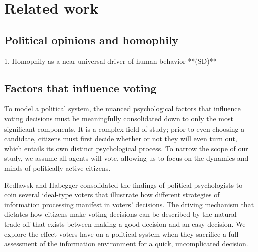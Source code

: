 \section{Related work}
\label{sec:related}



\subsection{Political opinions and homophily}
    1. Homophily as a near-universal driver of human behavior **(SD)**

\subsection{Factors that influence voting}
To model a political system, the nuanced psychological factors that influence voting decisions must be meaningfully consolidated down to only the most significant components.
It is a complex field of study; prior to even choosing a candidate, citizens must first decide whether or not they will even turn out, which entails its own distinct psychological process. To narrow the scope of our study, we assume all agents will vote, allowing us to focus on the dynamics and minds of politically active citizens.

Redlawsk 
and Habegger \cite{redlawsk_citizens_2020} consolidated the findings of political psychologists to coin 
several ideal-type voters that illustrate how different strategies of information 
processing manifest in voters’ decisions. The driving mechanism that dictates how 
citizens make voting decisions can be described by the natural trade-off that exists between making 
a good decision and an easy decision. We explore the effect voters have on a political 
system when they sacrifice a full assessment of the information environment for a 
quick, uncomplicated decision. 


